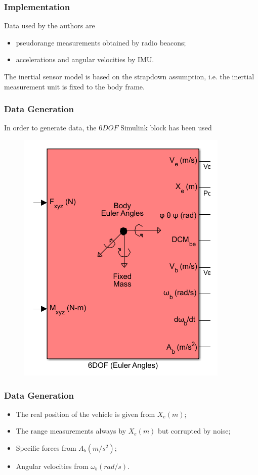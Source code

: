 \documentclass{beamer}
\begin{document}
	\begin{frame}
		\frametitle{Implementation}
		Data used by the authors are \\
		\begin{itemize}
			\item pseudorange measurements obtained by radio beacons;
			\item accelerations and angular velocities by IMU. 
		\end{itemize}
		\vspace{0.5cm}
		The inertial sensor model is based on the strapdown assumption, i.e. the inertial measurement unit is fixed to the body frame.
	\end{frame}
	
	\begin{frame}
		\frametitle{Data Generation}
		In order to generate data, the $6DOF$ Simulink block has been used
		\begin{figure}[H]
			\includegraphics[scale=0.4]{6DOF}
		\end{figure}
	\end{frame}
	
	\begin{frame}
		\frametitle{Data Generation}
		\begin{itemize}
			\item The real position of the vehicle is given from $X_e(m)$;
			\item The range measurements always by $X_e(m)$ but corrupted by noise;
			\item Specific forces from $A_b(m/s^2)$;
			\item Angular velocities from $\omega_b(rad/s)$.
		\end{itemize}
	\end{frame}
\end{document}
